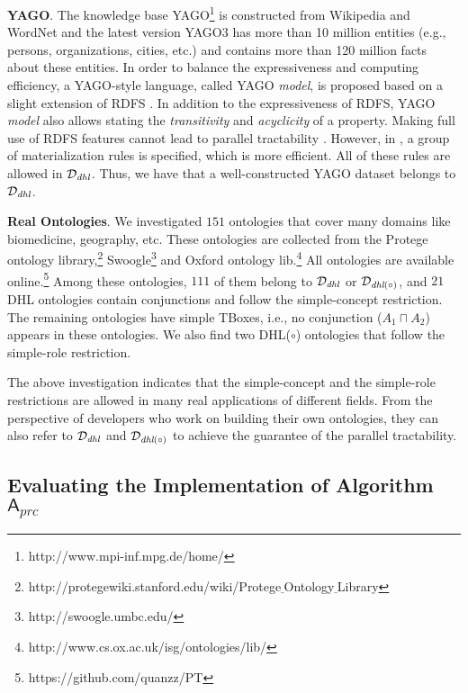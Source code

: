 \documentclass[final,1p,times]{elsarticle}
\begin{document}
\textbf{YAGO}. The knowledge base YAGO\footnote{http://www.mpi-inf.mpg.de/home/}
is constructed from Wikipedia and WordNet and the latest version
YAGO3 \cite{MahdisoltaniBS15} has more than 10 million entities
(e.g., persons, organizations, cities, etc.)
and contains more than 120 million facts about these entities.
In order to balance the expressiveness and computing efficiency,
a YAGO-style language, called YAGO \emph{model}, is proposed based on
a slight extension of RDFS \cite{SuchanekKW08}.
In addition to the expressiveness of RDFS,
YAGO \emph{model} also allows stating the \emph{transitivity} and \emph{acyclicity} of a property.
Making full use of RDFS features cannot lead to parallel tractability \cite{Horst05}.
However, in \cite{SuchanekKW08}, a group of materialization rules
is specified, which is more efficient.
All of these rules are allowed in $\mathcal{D}_{\textit{\text{dhl}}}$.
Thus, we have that a well-constructed YAGO dataset belongs to $\mathcal{D}_{\textit{\text{dhl}}}$.

\textbf{Real Ontologies}. We investigated
$151$ ontologies that cover many domains
like biomedicine, geography, etc.
These ontologies are collected
from the Protege ontology library,\footnote{http://protegewiki.stanford.edu/wiki/Protege$\underline{~}$Ontology$\underline{~}$Library}
Swoogle\footnote{http://swoogle.umbc.edu/}
and Oxford ontology lib.\footnote{http://www.cs.ox.ac.uk/isg/ontologies/lib/}
All ontologies are available online.\footnote{https://github.com/quanzz/PT}
Among these ontologies, $111$ of them belong to $\mathcal{D}_{\textit{\text{dhl}}}$
or $\mathcal{D}_{\textit{\text{dhl}}(\circ)}$, and $21$ DHL ontologies contain
conjunctions and follow the simple-concept restriction.
The remaining ontologies have simple TBoxes, i.e., no conjunction ($A_1\sqcap A_2$)
appears in these ontologies.
We also find two DHL($\circ$) ontologies
that follow the simple-role restriction.

The above investigation indicates that the simple-concept and the simple-role restrictions
are allowed in many real applications of different fields.
From the perspective of developers who work on building their own ontologies,
they can also refer to $\mathcal{D}_{\textit{\text{dhl}}}$ and $\mathcal{D}_{\textit{\text{dhl}}(\circ)}$
to achieve the guarantee of the parallel tractability.


\subsection{Evaluating the Implementation of Algorithm~$\mathsf{A}_{prc}$}
\end{document}
